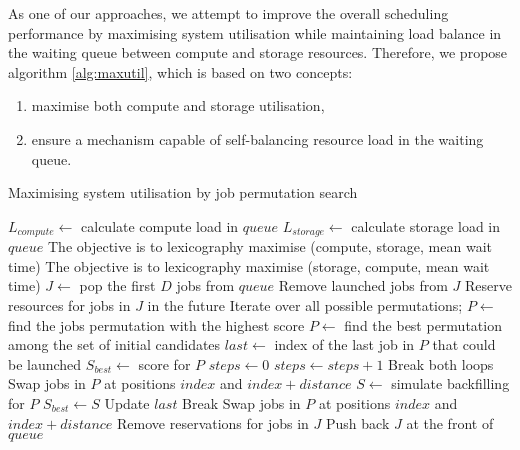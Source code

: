 \documentclass[thesis-en.tex]{subfiles}
\begin{document}
As one of our approaches, we attempt to improve the overall scheduling performance by maximising system utilisation while maintaining load balance in the waiting queue between compute and storage resources. Therefore, we propose algorithm \ref{alg:maxutil}, which is based on two concepts:
\begin{enumerate}
    \item maximise both compute and storage utilisation,
    \item ensure a mechanism capable of self-balancing resource load in the waiting queue.
\end{enumerate}

\begin{algorithm}[p]
\caption{Maximising system utilisation by job permutation search}
\label{alg:maxutil}
\begin{algorithmic}[1]
  \Statex
  \Statex
  \State $L_{compute} \gets$ calculate compute load in $queue$
  \State $L_{storage} \gets$ calculate storage load in $queue$
    \State The objective is to lexicography maximise (compute, storage, mean wait time)
  \Else
    \State The objective is to lexicography maximise (storage, compute, mean wait time)
  \EndIf
  \Statex
  \State $J \gets$ pop the first $D$ jobs from $queue$ \label{alg:maxutil:pop}
  \State {}
  \State Remove launched jobs from $J$
  \State Reserve resources for jobs in $J$ in the future \label{alg:maxutil:reserve}
  \Statex
    \State Iterate over all possible permutations;
    \State $P \gets$ find the jobs permutation with the highest score
  \Statex
  \Else
    \State $P \gets$ find the best permutation among the set of initial candidates
    \State $last \gets$ index of the last job in $P$ that could be launched
    \State $S_{best} \gets$ score for $P$
    \State $steps \gets 0$ 
        \State $steps \gets steps + 1$
          Break both loops
        \EndIf
        \State Swap jobs in $P$ at positions $index$ and $index + distance$
        \State $S \gets$ simulate backfilling for $P$
          \State $S_{best} \gets S$
          \State Update $last$
          \State Break
        \Else
          \State Swap jobs in $P$ at positions $index$ and $index + distance$
        \EndIf
      \EndFor
    \EndFor
  \EndIf
  \Statex
  \State {}
  \State Remove reservations for jobs in $J$
  \State Push back $J$ at the front of $queue$
\EndProcedure
\end{algorithmic}
\end{algorithm}
\end{document}
